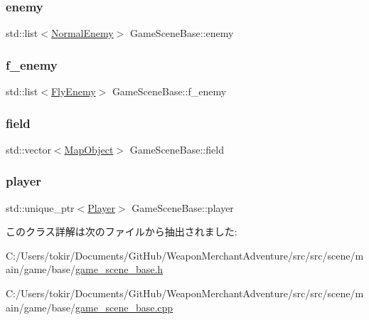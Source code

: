 \mbox{\label{class_game_scene_base_a5203f71e49d0a65de546dce23670b39e}} 
\subsubsection{\texorpdfstring{enemy}{enemy}}
{\footnotesize\ttfamily std\+::list$<$\mbox{\hyperlink{class_normal_enemy}{Normal\+Enemy}}$>$ Game\+Scene\+Base\+::enemy}

\mbox{\label{class_game_scene_base_ad34ad8c64d483b662352b9a806634bd9}} 
\subsubsection{\texorpdfstring{f\+\_\+enemy}{f\_enemy}}
{\footnotesize\ttfamily std\+::list$<$\mbox{\hyperlink{class_fly_enemy}{Fly\+Enemy}}$>$ Game\+Scene\+Base\+::f\+\_\+enemy}

\mbox{\label{class_game_scene_base_a27a6d9806fd1f23a651a545c94a24254}} 
\subsubsection{\texorpdfstring{field}{field}}
{\footnotesize\ttfamily std\+::vector$<$\mbox{\hyperlink{class_map_object}{Map\+Object}}$>$ Game\+Scene\+Base\+::field}

\mbox{\label{class_game_scene_base_a86d056176f172dc0115d00878956a741}} 
\subsubsection{\texorpdfstring{player}{player}}
{\footnotesize\ttfamily std\+::unique\+\_\+ptr$<$\mbox{\hyperlink{class_player}{Player}}$>$ Game\+Scene\+Base\+::player}



このクラス詳解は次のファイルから抽出されました\+:\begin{DoxyCompactItemize}
\item 
C\+:/\+Users/tokir/\+Documents/\+Git\+Hub/\+Weapon\+Merchant\+Adventure/src/src/scene/main/game/base/\mbox{\hyperlink{game__scene__base_8h}{game\+\_\+scene\+\_\+base.\+h}}\item 
C\+:/\+Users/tokir/\+Documents/\+Git\+Hub/\+Weapon\+Merchant\+Adventure/src/src/scene/main/game/base/\mbox{\hyperlink{game__scene__base_8cpp}{game\+\_\+scene\+\_\+base.\+cpp}}\end{DoxyCompactItemize}
